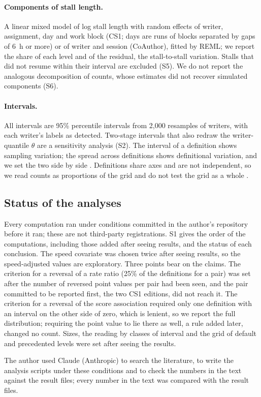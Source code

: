 \paragraph{Components of stall length.} A linear mixed model of log stall length with random effects of writer,
assignment, day and work block (CS1; days are runs of blocks separated by gaps of 6~h or more) or of writer and
session (CoAuthor), fitted by REML; we report the share of each level and of the residual, the stall-to-stall
variation. Stalls that did not resume within their interval are excluded (S5). We do not report the analogous
decomposition of counts, whose estimates did not recover simulated components (S6).

\paragraph{Intervals.} All intervals are 95\% percentile intervals from 2,000 resamples of writers, with each
writer's labels as detected. Two-stage intervals that also redraw the writer-quantile $\theta$ are a
sensitivity analysis (S2). The interval of a
definition shows sampling variation; the spread across definitions shows definitional variation, and we set the two
side by side \cite{robitzsch2022multiverse}. Definitions share axes and are not independent, so we read counts as
proportions of the grid and do not test the grid as a whole \cite{simonsohn2020specification}.

\subsection{Status of the analyses}
\label{sec:status}

Every computation ran under conditions committed in the author's repository before it ran; these are not third-party
registrations. S1 gives the order of the computations, including those added after seeing results,
and the status of each conclusion. The speed covariate was chosen twice after seeing results, so the speed-adjusted values are exploratory. Three points bear
on the claims. The criterion for a reversal of a rate ratio (25\% of the
definitions for a pair) was set after the number of reversed point values per pair had been seen, and the pair committed
to be reported first, the two CS1 editions, did not reach it. The criterion for a reversal of the score association
required only one definition with an interval on the other side of zero, which is lenient, so we report the full
distribution; requiring the point value to lie there as well, a rule added later, changed no count. Sizes, the
reading by classes of interval and the grid of default and precedented levels were set after seeing the results.

The author used Claude (Anthropic) to search the literature, to write the analysis scripts under these conditions and
to check the numbers in the text against the result files; every number in the text was compared with the result files.

